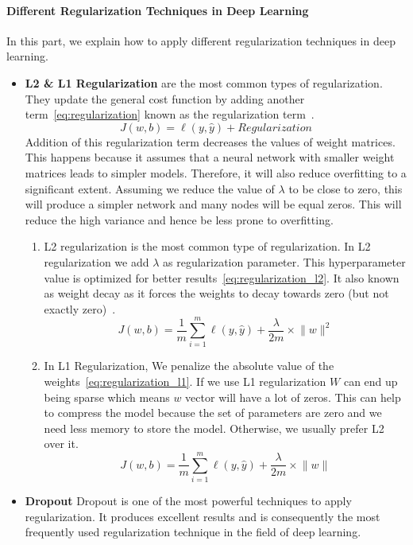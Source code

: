 \paragraph{Different Regularization Techniques in Deep Learning}

In this part, we explain how to apply different regularization techniques in deep learning.

\begin{itemize}
\item \textbf{L2 \& L1 Regularization} are the most common types of regularization. They update the general cost function by adding another term~\eqref{eq:regularization} known as the regularization term~\cite{Web_Analyticsvidhya_Regularization}.
\begin{equation}\label{eq:regularization}
J(w,b) = \ell(y,\widehat{y}) + Regularization
\end{equation}
%
Addition of this regularization term decreases the values of weight matrices. This happens because it assumes that a neural network with smaller weight matrices leads to simpler models. Therefore, it will also reduce overfitting to a significant extent. Assuming we reduce the value of $\lambda$ to be close to zero, this will produce a simpler network and many nodes will be equal zeros. This will reduce the high variance  and hence be less prone to overfitting.%
\begin{enumerate}
\item L2 regularization is the most common type of regularization. In L2 regularization we add $\lambda$ as regularization parameter. This  hyperparameter value is optimized for better results~\eqref{eq:regularization_l2}. It also known as weight decay as it forces the weights to decay towards zero (but not exactly zero)~\cite{Web_Analyticsvidhya_Regularization}.%
\begin{equation}\label{eq:regularization_l2}
J(w,b) = \frac{1}{m} \sum_{i=1}^{m} \ell(y,\widehat{y})+\frac{\lambda}{2m} \times \lVert w \rVert^2
\end{equation}%
\item In L1 Regularization, We penalize the absolute value of the weights~\eqref{eq:regularization_l1}. If we use L1 regularization $W$ can end up being sparse which means $w$ vector will have a lot of zeros. This can help to compress the model because the set of parameters are zero and we need less memory to store the model. Otherwise, we usually prefer L2 over it.%
\begin{equation}\label{eq:regularization_l1}
J(w,b) = \frac{1}{m} \sum_{i=1}^{m} \ell(y,\widehat{y})+\frac{\lambda}{2m} \times \lVert w \rVert
\end{equation}
   \end{enumerate}
  \item \textbf{Dropout}
Dropout is one of the most powerful techniques to apply regularization. It produces excellent results and is consequently the most frequently used regularization technique in the field of deep learning.


\end{itemize}
